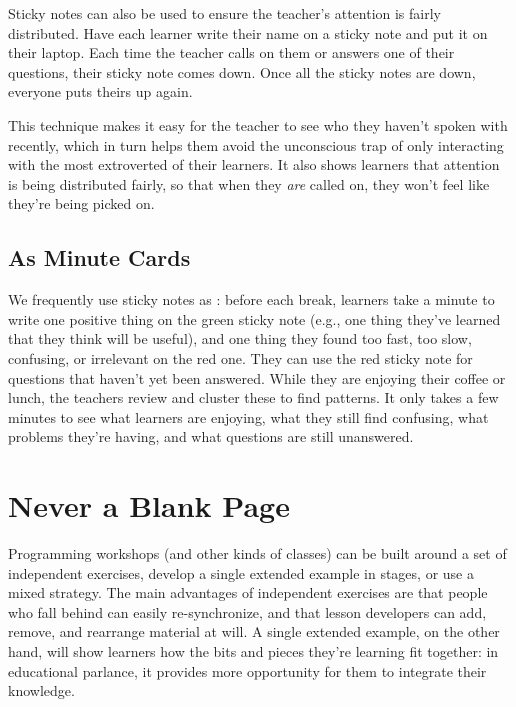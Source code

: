 Sticky notes can also be used to ensure the teacher's attention is
fairly distributed. Have each learner write their name on a sticky
note and put it on their laptop. Each time the teacher calls on them
or answers one of their questions, their sticky note comes down. Once
all the sticky notes are down, everyone puts theirs up again.

This technique makes it easy for the teacher to see who they haven't
spoken with recently, which in turn helps them avoid the unconscious
trap of only interacting with the most extroverted of their learners.
It also shows learners that attention is being distributed fairly, so
that when they \emph{are} called on, they won't feel like they're
being picked on.

\subsection{As Minute Cards}\label{s:classroom-minute-cards}

We frequently use sticky notes as : before each break, learners take a minute to write one
positive thing on the green sticky note (e.g., one thing they've
learned that they think will be useful), and one thing they found too
fast, too slow, confusing, or irrelevant on the red one. They can use
the red sticky note for questions that haven't yet been answered.
While they are enjoying their coffee or lunch, the teachers review and
cluster these to find patterns. It only takes a few minutes to see
what learners are enjoying, what they still find confusing, what
problems they're having, and what questions are still unanswered.

\section{Never a Blank Page}\label{s:classroom-blank}

Programming workshops (and other kinds of classes) can be built around
a set of independent exercises, develop a single extended example in
stages, or use a mixed strategy. The main advantages of independent
exercises are that people who fall behind can easily re-synchronize,
and that lesson developers can add, remove, and rearrange material at
will.  A single extended example, on the other hand, will show
learners how the bits and pieces they're learning fit together: in
educational parlance, it provides more opportunity for them to
integrate their knowledge.

